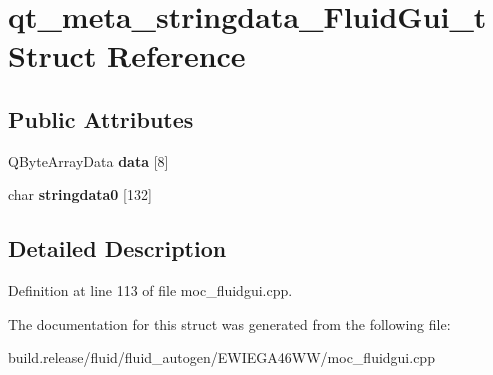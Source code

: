 \hypertarget{structqt__meta__stringdata___fluid_gui__t}{}\section{qt\+\_\+meta\+\_\+stringdata\+\_\+\+Fluid\+Gui\+\_\+t Struct Reference}
\label{structqt__meta__stringdata___fluid_gui__t}
\subsection*{Public Attributes}
\begin{DoxyCompactItemize}
\item 
\mbox{\label{structqt__meta__stringdata___fluid_gui__t_a16073242f662d89b2776e5f087a411b4}} 
Q\+Byte\+Array\+Data {\bfseries data} \mbox{[}8\mbox{]}
\item 
\mbox{\label{structqt__meta__stringdata___fluid_gui__t_ad5964af3136d74634ca4b40fe9cb91a6}} 
char {\bfseries stringdata0} \mbox{[}132\mbox{]}
\end{DoxyCompactItemize}


\subsection{Detailed Description}


Definition at line 113 of file moc\+\_\+fluidgui.\+cpp.



The documentation for this struct was generated from the following file\+:\begin{DoxyCompactItemize}
\item 
build.\+release/fluid/fluid\+\_\+autogen/\+E\+W\+I\+E\+G\+A46\+W\+W/moc\+\_\+fluidgui.\+cpp\end{DoxyCompactItemize}
